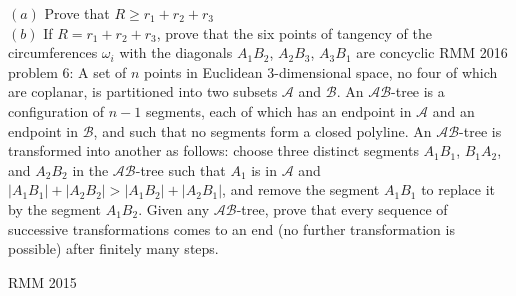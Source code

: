 $(a)$ Prove that $R\geq r_1+r_2+r_3$ \\
$(b)$ If $R= r_1+r_2+r_3$, prove that the six points of tangency of the circumferences $\omega_i$ with the diagonals $A_1B_2$, $A_2B_3$, $A_3B_1$ are concyclic 
RMM 2016 problem 6:  A set of $n$ points in Euclidean 3-dimensional space, no four of which are coplanar, is partitioned into two subsets $\mathcal{A}$ and $\mathcal{B}$. An $\mathcal{AB}$-tree is a configuration of $n-1$ segments, each of which has an endpoint in $\mathcal{A}$ and an endpoint in $\mathcal{B}$, and such that no segments form a closed polyline. An $\mathcal{AB}$-tree is transformed into another as follows: choose three distinct segments $A_1B_1$, $B_1A_2$, and $A_2B_2$ in the $\mathcal{AB}$-tree such that $A_1$ is in $\mathcal{A}$ and $|A_1B_1|+|A_2B_2|>|A_1B_2|+|A_2B_1|$, and remove the segment $A_1B_1$ to replace it by the segment $A_1B_2$. Given any $\mathcal{AB}$-tree, prove that every sequence of successive transformations comes to an end (no further transformation is possible) after finitely many steps. 

RMM 2015 

